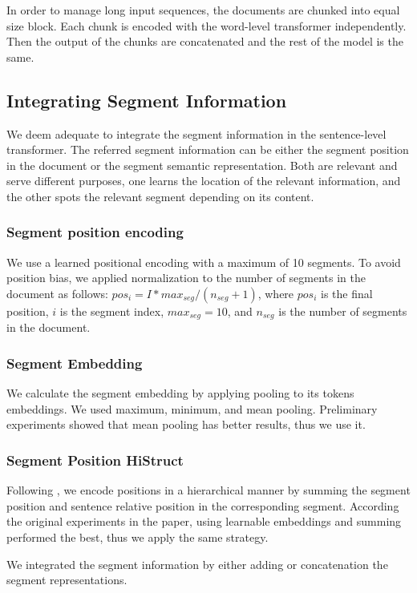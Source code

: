 \documentclass[sigconf]{acmart}
\begin{document}
In order to manage long input sequences, the documents are chunked into equal size block. Each chunk is encoded with the word-level transformer independently. Then the output of the chunks are concatenated and the rest of the model is the same. 

\subsection{Integrating Segment Information}
We deem adequate to integrate the segment information in the sentence-level transformer. The referred segment information can be either the segment position in the document or the segment semantic representation. Both are relevant and serve different purposes, one learns the location of the relevant information, and the other spots the relevant segment depending on its content. 

\subsubsection{Segment position encoding} 
We use a learned positional encoding with a maximum of 10 segments. To avoid position bias, we applied normalization to the number of segments in the document as follows: $pos_i = I*max_{seg}/(n_{seg} + 1)$, where $pos_i$ is the final position, $i$ is the segment index, $max_{seg}=10$, and $n_{seg}$ is the number of segments in the document. 

\subsubsection{Segment Embedding}
We calculate the segment embedding by applying pooling to its tokens embeddings. We used maximum, minimum, and mean pooling. Preliminary experiments showed that mean pooling has better results, thus we use it.

\subsubsection{Segment Position HiStruct} 
Following \cite{ruan-etal-2022-histruct}, we encode positions in a hierarchical manner by summing the segment position and sentence relative position in the corresponding segment. According the original experiments in the paper, using learnable embeddings and summing performed the best, thus we apply the same strategy.

We integrated the segment information by either adding or concatenation the segment representations.
\end{document}
